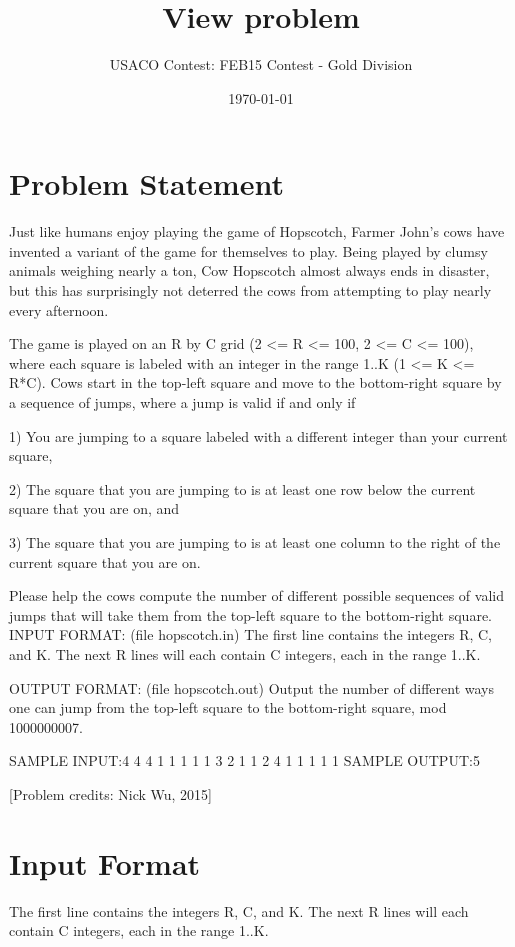\documentclass[12pt]{article}
\title{View problem}
\author{USACO Contest: FEB15 Contest - Gold Division}
\date{\today}
\begin{document}
\maketitle

\section*{Problem Statement}

Just like humans enjoy playing the game of Hopscotch, Farmer John's cows have invented a variant of the game for themselves to play.  Being played by clumsy animals weighing nearly a ton, Cow Hopscotch almost always ends in disaster, but this has surprisingly not deterred the cows from attempting to play nearly every afternoon.

The game is played on an R by C grid (2 <= R <= 100, 2 <= C <= 100), where each square is labeled with an integer in the range 1..K (1 <= K <= R*C).  Cows start in the top-left square and move to the bottom-right square by a sequence of jumps, where a jump is valid if and only if

1) You are jumping to a square labeled with a different integer than your current square,

2) The square that you are jumping to is at least one row below the current square that you are on, and

3) The square that you are jumping to is at least one column to the right of the current square that you are on.

Please help the cows compute the number of different possible sequences of valid jumps that will take them from the top-left square to the bottom-right square.
INPUT FORMAT: (file hopscotch.in)
The first line contains the integers R, C, and K.  
The next R lines will each contain C integers, each in the range 1..K.

OUTPUT FORMAT: (file hopscotch.out)
Output the number of different ways one can jump from the top-left square to the bottom-right square, mod 1000000007.

SAMPLE INPUT:4 4 4
1 1 1 1
1 3 2 1
1 2 4 1
1 1 1 1
SAMPLE OUTPUT:5


[Problem credits: Nick Wu, 2015]



\section*{Input Format}
The first line contains the integers R, C, and K.  
The next R lines will each contain C integers, each in the range 1..K.
\end{document}
